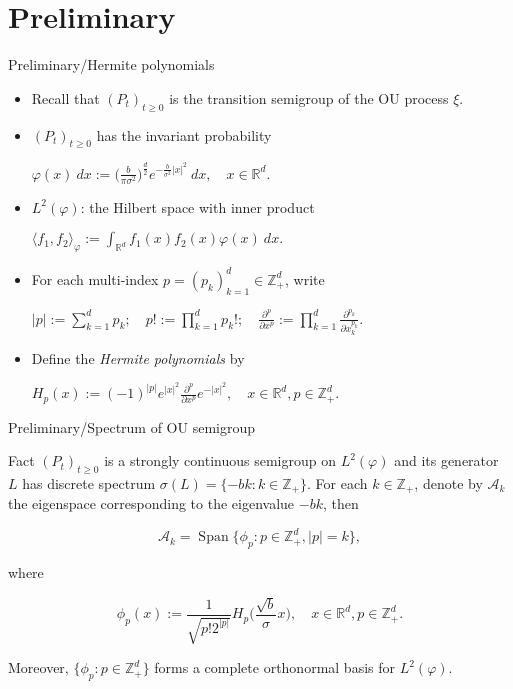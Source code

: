 \documentclass[xcolor=dvipsnames]{beamer}
\begin{document}
\section{Preliminary}
\begin{frame}{Preliminary/Hermite polynomials}
\begin{itemize}
\item
  Recall that $(P_t)_{t\geq 0}$ is the transition semigroup of the OU process $\xi$.
\item
  $(P_t)_{t\geq 0}$ has the invariant probability
  
  \centerline{ \( \displaystyle	
    \varphi(x)~dx
    := \Big(\frac{b}{\pi \sigma^2} \Big)^{\frac{d}{2}} e^{-\frac{b}{\sigma^2}|x|^2}~dx,
    \quad x\in \mathbb R^d.
    \)}
\item
  $L^2(\varphi)$: the Hilbert space with inner product
  
  \centerline{ \( \displaystyle    
    \langle f_1, f_2 \rangle_{\varphi}
    := \int_{\mathbb R^d}f_1(x)f_2(x)\varphi(x)~dx.
    \)}
\item
    For each multi-index $p = (p_k)_{k = 1}^d \in \mathbb{Z}_+^{d}$, write 
  
    \centerline{ \( \displaystyle	
      |p|:=\sum_{k=1}^d p_k;
      \quad p!:= \prod_{k= 1}^d p_k!;
      \quad \frac{\partial^p} {\partial x^p}:= \prod_{k = 1}^d\frac{\partial^{p_k}}{\partial x_k^{p_k}}.
      \)}
\item
    Define the \emph{Hermite polynomials} by
    
    \centerline{ \( \displaystyle
      H_p(x)
      :=(-1)^{|p|}e^{|x|^2} \frac{\partial ^{p}}{\partial x^p} e^{-|x|^2} ,
      \quad x\in \mathbb R^d,
      p \in \mathbb{Z}_+^{d}.
      \)}
\end{itemize}
\end{frame}

\begin{frame}{Preliminary/Spectrum of OU semigroup}
\begin{block}{Fact}
	$(P_t)_{t\geq 0}$ is a strongly continuous semigroup on $L^2(\varphi)$ and its generator $L$ has discrete spectrum $\sigma(L)= \{-bk: k \in \mathbb Z_+\}$.
  For each $k \in \mathbb Z_+$, denote by $\mathcal{A}_k$ the eigenspace corresponding to the eigenvalue $-bk$, then

  \[
    \mathcal{A}_k
    = \operatorname{Span} \{\phi_p : p\in \mathbb Z_+^d, |p|=k\},
  \]

    where

    \[
    \phi_p(x)
    := \frac{1}{\sqrt{ p! 2^{|p|} }} H_p \Big(\frac{ \sqrt{b} }{\sigma}x \Big),
    \quad x\in \mathbb R^d, p\in \mathbb Z_+^d.
    \]

    Moreover, $\{\phi_p:p\in \mathbb Z_+^d\}$ forms a complete orthonormal basis for $L^2(\varphi)$.
\end{block}
\end{frame}
\end{document}
